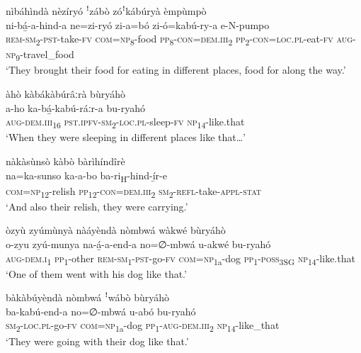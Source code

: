 nìbáhìndà nèzíryó ꜝzábò zóꜝkábúryà èmpùmpò\\
\gll ni-bá̲-a-hind-a    ne=zi-ryó    zi-a=bó zi-ó=kabú-ry-a     e-N-pumpo \\
\textsc{rem}{}-\textsc{sm}\textsubscript{2}{}-\textsc{pst}{}-take-\textsc{fv}  \textsc{com}=\textsc{np}\textsubscript{8}{}-food  \textsc{pp}\textsubscript{8\-}{}-\textsc{con}=\textsc{dem}.\textsc{iii}\textsubscript{2}
\textsc{pp}\textsubscript{2}{}-\textsc{con}=\textsc{loc}.\textsc{pl}{}-eat-\textsc{fv}  \textsc{aug}{}-\textsc{np}\-\textsubscript{9}{}-travel\_food\\
\glt ‘They brought their food for eating in different places, food for along the way.’\bigskip

àhò kàbákàbúrâːrà bùryáhò\\
\gll a-ho      ka-bá̲-kabú-ráːr-a      bu-ryahó\\
\textsc{aug}{}-\textsc{dem}.\textsc{iii}\textsubscript{16}  \textsc{pst}.\textsc{ipfv}{}-\textsc{sm}\textsubscript{2}{}-\textsc{loc}.\textsc{pl}{}-sleep-\textsc{fv}  \textsc{np}\textsubscript{14}{}-like.that\\
\glt ‘When they were sleeping in different places like that…’\bigskip

nàkàsùnsò kàbò bàrìhíndîrè\\
\gll na=ka-sunso    ka-a-bo    ba-ri\textsubscript{H}{}-hind-í̲r-e\\
\textsc{com}=\textsc{np}\textsubscript{12}{}-relish  \textsc{pp}\textsubscript{12}{}-\textsc{con}=\textsc{dem}.\textsc{iii}\textsubscript{2}  \textsc{sm}\textsubscript{2}{}-\textsc{refl}{}-take-\textsc{appl}{}-\textsc{stat}\\
\glt ‘And also their relish, they were carrying.’\bigskip

\newpage
òzyù zyúmùnyà nàáyèndà nòmbwá wàkwé bùryáhò\\
\gll o-zyu    zyú-munya  na-á̲-a-end-a  no=∅-mbwá    u-akwé  bu-ryahó \\
\textsc{aug}{}-\textsc{dem}.\textsc{i}\textsubscript{1}  \textsc{pp}\textsubscript{1}{}-other  \textsc{rem}{}-\textsc{sm}\textsubscript{1}{}-\textsc{pst}{}-go-\textsc{fv}
\textsc{com}=\textsc{np}\textsubscript{1a}{}-dog  \textsc{pp}\textsubscript{1}{}-\textsc{poss}\textsubscript{3SG}  \textsc{np}\textsubscript{14}{}-like.that\\
\glt ‘One of them went with his dog like that.’\bigskip

bàkàbúyèndà nòmbwá ꜝwábò bùryáhò\\
\gll ba-kabú-end-a  no=∅-mbwá    u-abó      bu-ryahó\\
\textsc{sm}\textsubscript{2}{}-\textsc{loc}.\textsc{pl}{}-go-\textsc{fv}  \textsc{com}=\textsc{np}\textsubscript{1a}{}-dog  \textsc{pp}\textsubscript{1}{}-\textsc{aug}{}-\textsc{dem}.\textsc{iii}\textsubscript{2}  \textsc{np}\textsubscript{14}{}-like\_that\\
\glt ‘They were going with their dog like that.’\bigskip

